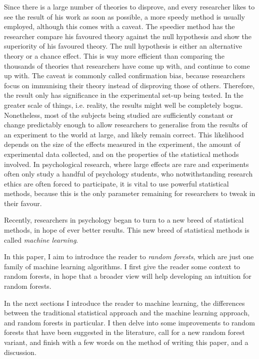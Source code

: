 \documentclass[a4paper,man,12pt,apacite,floatsintext,draftfirst]{apa6} %
\begin{document}
Since there is a large number of theories to disprove, and every
researcher likes to see the result of his work as soon as possible, a
more speedy method is usually employed, although this comes with a caveat.
The speedier method has the researcher compare his favoured theory against
the null hypothesis and show the superiority of his favoured theory.
The null hypothesis is either an alternative theory or a chance effect.
This is way more efficient than comparing the thousands of
theories that researchers have come up with, and continue to come up with.
The caveat is commonly called confirmation bias, because researchers focus
on immunising their theory instead of disproving those of others.
Therefore, the result only has significance in the experimental set-up
being tested.
In the greater scale of things, i.e. reality, the results might well be
completely bogus.
Nonetheless, most of the subjects being studied are sufficiently constant
or change predictably enough to allow researchers to generalise from the
results of an experiment to the world at large, and likely remain correct.
This likelihood depends on the size of the effects measured in the
experiment, the amount of experimental data collected,
and on the properties of the statistical methods involved.
In psychological research, where large effects are rare and
experiments often only study a handful of psychology students, who
notwithstanding research ethics are often forced to participate, it is
vital to use powerful statistical methods, because this is the only parameter
remaining for researchers to tweak in their favour.

Recently, researchers in psychology began to turn to a new breed of
statistical methods, in hope of ever better results. This new breed of
statistical methods is called \emph{machine learning}.

In this paper, I aim to introduce the reader to \emph{random forests},
which are just one family of machine learning algorithms.
I first give the reader some context to random forests, in hope that a
broader view will help developing an intuition for random forests.

In the next sections I introduce the reader to machine learning,
the differences between the traditional statistical approach and the
machine learning approach, and random forests in particular.
I then delve into some improvements to random forests that have been
suggested in the literature, call for a new random forest variant, and finish
with a few words on the method of writing this paper, and a discussion.
\end{document}

